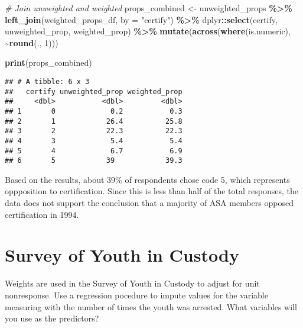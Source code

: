 \documentclass[]{article}
\newenvironment{Shaded}{\begin{snugshade}}{\end{snugshade}}
\newcommand{\AttributeTok}[1]{\textcolor[rgb]{0.13,0.29,0.53}{#1}}
\newcommand{\CommentTok}[1]{\textcolor[rgb]{0.56,0.35,0.01}{\textit{#1}}}
\newcommand{\DecValTok}[1]{\textcolor[rgb]{0.00,0.00,0.81}{#1}}
\newcommand{\FunctionTok}[1]{\textcolor[rgb]{0.13,0.29,0.53}{\textbf{#1}}}
\newcommand{\NormalTok}[1]{#1}
\newcommand{\OtherTok}[1]{\textcolor[rgb]{0.56,0.35,0.01}{#1}}
\newcommand{\SpecialCharTok}[1]{\textcolor[rgb]{0.81,0.36,0.00}{\textbf{#1}}}
\newcommand{\StringTok}[1]{\textcolor[rgb]{0.31,0.60,0.02}{#1}}
\begin{document}
\begin{Shaded}
\begin{Highlighting}[]
\CommentTok{\# Join unweighted and weighted}
\NormalTok{props\_combined }\OtherTok{\textless{}{-}}\NormalTok{ unweighted\_props }\SpecialCharTok{\%\textgreater{}\%}
  \FunctionTok{left\_join}\NormalTok{(weighted\_props\_df, }\AttributeTok{by =} \StringTok{"certify"}\NormalTok{) }\SpecialCharTok{\%\textgreater{}\%}
\NormalTok{  dplyr}\SpecialCharTok{::}\FunctionTok{select}\NormalTok{(certify, unweighted\_prop, weighted\_prop) }\SpecialCharTok{\%\textgreater{}\%}
  \FunctionTok{mutate}\NormalTok{(}\FunctionTok{across}\NormalTok{(}\FunctionTok{where}\NormalTok{(is.numeric), }\SpecialCharTok{\textasciitilde{}}\FunctionTok{round}\NormalTok{(., }\DecValTok{1}\NormalTok{)))}

\FunctionTok{print}\NormalTok{(props\_combined)}
\end{Highlighting}
\end{Shaded}

\begin{verbatim}
## # A tibble: 6 x 3
##   certify unweighted_prop weighted_prop
##     <dbl>           <dbl>         <dbl>
## 1       0             0.2           0.3
## 2       1            26.4          25.8
## 3       2            22.3          22.3
## 4       3             5.4           5.4
## 5       4             6.7           6.9
## 6       5            39            39.3
\end{verbatim}


Based on the results, about 39\% of respondents chose code 5, which represents oppposition to certification. Since this is less than half of the total responses, the data does not support the conclusion that a majority of ASA members opposed certification in 1994. 

\section{Survey of Youth in Custody} 
Weights are used in the Survey of Youth in Custody to adjust for unit nonresponse. Use a regression pocedure to impute values for the variable measuring with the number of times the youth was arrested. What variables will you use as the predictors? 
\end{document}
